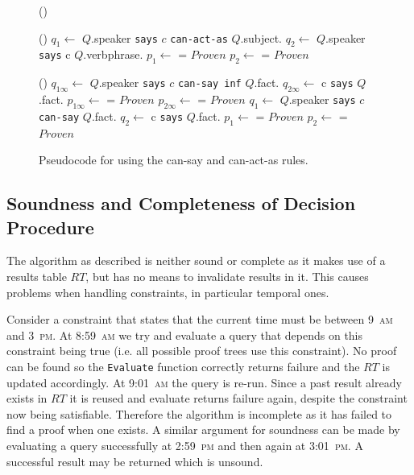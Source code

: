 \documentclass[thesis.tex]{subfiles}
\begin{document}
\begin{figure}\footnotesize\sffamily\centering
  \begin{algorithm}[H]
    \Fn(){}{
    }
    
    \Fn(){}{
      $q_1 \gets$ $Q$.speaker \texttt{says} $c$ \texttt{can-act-as} $Q$.subject.\; 
      $q_2 \gets$ $Q$.speaker \texttt{says} c $Q$.verbphrase.\;
      $p_1 \gets$  = $Proven$\;
      $p_2 \gets$  = $Proven$\;
    }
    
    \Fn(){}{
      $q_{1\infty} \gets$ $Q$.speaker \texttt{says} $c$ \texttt{can-say inf} $Q$.fact.\; 
      $q_{2\infty} \gets$ c \texttt{says} $Q$.fact.\;
      $p_{1\infty} \gets$  = $Proven$\;
      $p_{2\infty} \gets$  = $Proven$\;
      $q_1 \gets$ $Q$.speaker \texttt{says} $c$ \texttt{can-say} $Q$.fact.\; 
      $q_2 \gets$ c \texttt{says} $Q$.fact.\;
      $p_1 \gets$  = $Proven$\;
      $p_2 \gets$  = $Proven$\;
    }
  \end{algorithm}
  \caption{Pseudocode for using the can-say and can-act-as rules.}
  \label{alg:eval2}
\end{figure}

\subsection{Soundness and Completeness of Decision Procedure}

The algorithm as described is neither sound or complete as it makes use of a
results table $RT$, but has no means to invalidate results in it. This causes
problems when handling constraints, in particular temporal ones. 

Consider a constraint that states that the current time must be between
9~\textsc{am} and 3~\textsc{pm}. At 8:59~\textsc{am} we try and evaluate a query
that depends on this constraint being true (i.e. all possible proof trees use
this constraint). No proof can be found so the \texttt{Evaluate} function
correctly returns failure and the $RT$ is updated accordingly. At
9:01~\textsc{am} the query is re-run. Since a past result already exists in $RT$
it is reused and evaluate returns failure again, despite the constraint now
being satisfiable. Therefore the algorithm is incomplete as it has failed to
find a proof when one exists. A similar argument for soundness can be made by
evaluating a query successfully at 2:59~\textsc{pm} and then again at
3:01~\textsc{pm}. A successful result may be returned which is unsound.
\end{document}
